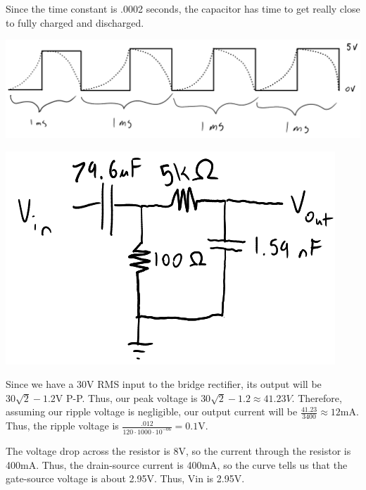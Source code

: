 \documentclass{article}
\begin{document}

Since the time constant is .0002 seconds, the capacitor has time to get really close to fully charged and discharged.
\begin{center}\includegraphics[scale=.4]{sharktooth.png}\end{center}

\newpage{}

    \begin{center}\includegraphics{bandpass.png}\end{center}

\newpage{}

    Since we have a 30V RMS input to the bridge rectifier, its output will be $30\sqrt2 -1.2$V P-P.
    Thus, our peak voltage is $30\sqrt2 - 1.2 \approx 41.23V.$
    Therefore, assuming our ripple voltage is negligible, our output current will be $\frac{41.23}{3400} \approx 12\text{mA}.$
    Thus, the ripple voltage is $\frac{.012}{120 \cdot 1000 \cdot 10^{-06}} = 0.1$V.

\newpage{}

    The voltage drop across the resistor is 8V, so the current through the resistor is 400mA.
    Thus, the drain-source current is 400mA, so the curve tells us that the gate-source voltage is about 2.95V.
    Thus, Vin is 2.95V.

\newpage{}
\end{document}
